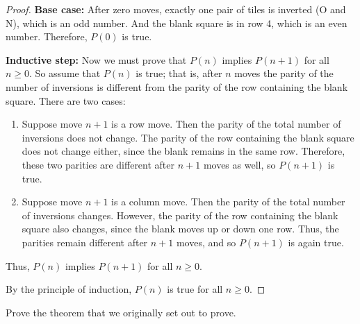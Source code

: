 \documentclass[twoside,12pt]{article}
\begin{document}
\begin{problem}{20}
{\begin{proof}
{\bf Base case:} After zero moves, exactly one pair of
tiles is inverted (O and N), which is an odd number.  And the blank
square is in row 4, which is an even number.  Therefore, $P(0)$ is true.

{\bf Inductive step:} Now we must prove that $P(n)$
implies $P(n+1)$ for all $n \geq 0$.  So assume that $P(n)$ is true;
that is, after $n$ moves the parity of the number of inversions is
different from the parity of the row containing the blank square.
There are two cases:

\begin{enumerate}

\item Suppose move $n+1$ is a row move.  Then the parity of the total
number of inversions does not change.
 The parity of the row containing
the blank square does not change either, since the blank remains in
the same row.  Therefore, these two parities are different after $n+1$
moves as well, so $P(n+1)$ is true.

\item Suppose move $n+1$ is a column move.  Then the parity of the
total number of inversions changes.
 However, the parity of the row
containing the blank square also changes, since the blank moves up or
down one row.  Thus, the parities remain different after $n+1$ moves,
and so $P(n+1)$ is again true.

\end{enumerate}

\noindent Thus, $P(n)$ implies $P(n+1)$ for all $n \geq 0$.

By the principle of induction, $P(n)$ is true for all $n \geq 0$.  
\end{proof}
}

Prove the theorem that we originally set out to prove.


\eparts

\end{problem}
\end{document}
